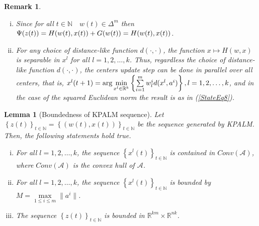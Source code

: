 \documentclass[11pt]{article}
\numberwithin{equation}{section}
\newtheorem{lemma}{Lemma}[proposition]
\newtheorem{remark}{Remark}
\begin{document}
\begin{remark} 
	\begin{enumerate}[(i)] \label{StateEq15}
		\item Since for all $t \in \mathbb{N} \quad w(t) \in \Delta^m$ then $\Psi(z(t)) = H(w(t),x(t)) + G(w(t)) \\ = H(w(t),x(t))$. \label{StateEq16}
		\item For any choice of distance-like function $d(\cdot, \cdot)$, the function $x \mapsto H(w,x)$ is separable in $x^l$ for all $l = 1, 2, \ldots, k$. Thus, regardless the choice of distance-like function $d(\cdot, \cdot)$, the centers update step can be done in parallel over all centers, that is, $x^l(t+1) = \arg\min\limits_{x^l \in \mathbb{R}^k} \left\lbrace \sum\limits_{i=1}^{m} w^i_l d(x^l , a^i) \right\rbrace, \\ l = 1, 2, \ldots, k$, and in the case of the squared Euclidean norm the result is as in (\ref{StateEq8}).
	\end{enumerate}
\end{remark}

\begin{lemma}[Boundedness of KPALM sequence]
Let $\left\lbrace z(t) \right\rbrace_{t \in \mathbb{N}} = \left\lbrace (w(t) , x(t)) \right\rbrace_{t \in \mathbb{N}}$ be the sequence generated by KPALM. Then, the following statements hold true.
\begin{enumerate}[(i)]
	\item For all $l=1, 2, \ldots ,k$, the sequence $\left\lbrace x^l(t) \right\rbrace_{t \in \mathbb{N}}$ is contained in $Conv(\mathcal{A})$, where $Conv(\mathcal{A})$ is the convex hull of $\mathcal{A}$.
	\item For all $l=1, 2, \ldots ,k$, the sequence $\left\lbrace x^l(t) \right\rbrace_{t \in \mathbb{N}}$ is bounded by $M = \max\limits_{1 \leq i \leq m} \| a^i \|$.
	\item The sequence $\left\lbrace z(t) \right\rbrace_{t \in \mathbb{N}}$ is bounded in $\mathbb{R}^{km} \times \mathbb{R}^{nk}$.
\end{enumerate}
\end{lemma}
\end{document}
